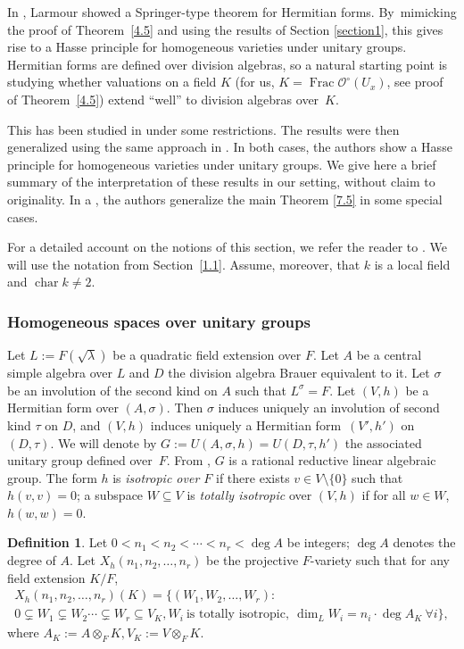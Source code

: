 \documentclass[10pt]{amsart}
\DeclareMathOperator{\Char}{char}
\DeclareMathOperator{\Frac}{Frac}
\let\backslash\setminus
\theoremstyle{definition}
\newtheorem{defn}[thm]{Definition}
\begin{document}
In \cite{larmour}, Larmour showed a Springer-type theorem for Hermitian forms. By~mimicking the proof of Theorem~\ref{4.5} and using the results of Section \ref{section1}, this gives rise to a Hasse principle for homogeneous varieties under unitary groups. Hermitian forms are defined over division algebras, so a natural starting point is studying whether valuations on a field $K$ (for us, $K=\Frac \mathcal{O}^{\circ}(U_x)$, see proof of Theorem~\ref{4.5}) extend ``well'' to division algebras over~$K$.

This has been studied in \cite{wu} under some restrictions. The results were then generalized using the same approach in \cite{parsur}. In both cases, the authors show a Hasse principle for homogeneous varieties under unitary groups. We give here a brief summary of the interpretation of these results in our setting, without claim to originality. In a \cite{guhsur}, the authors generalize the main Theorem \ref{7.5} in some special cases.

For a detailed account on the notions of this section, we refer the reader to \cite{involutions}. We will use the notation from Section~\ref{1.1}. Assume, moreover, that $k$ is a local field and ${\Char k \neq 2}$.

\subsubsection{Homogeneous spaces over unitary groups} \label{subsection7.1}

Let $L:=F(\sqrt{\lambda})$ be a quadratic field extension over $F$. Let $A$ be a central simple algebra over $L$ and $D$ the division algebra Brauer equivalent to it. Let $\sigma$ be an involution of the second kind on $A$ such that $L^{\sigma}=F$. Let $(V,h)$ be a Hermitian form over $(A, \sigma)$. Then $\sigma$ induces uniquely an involution of second kind $\tau$ on $D$, and $(V,h)$ induces uniquely a Hermitian form~$(V', h')$ on~$(D, \tau)$. We will denote by $G:=\textit{U}(A, \sigma, h)=\textit{U}(D, \tau, h')$ the associated unitary group defined over~$F$. From \cite[Prop.\,2.4]{merkchern}, $G$ is a rational reductive linear algebraic group. The form $h$ is \emph{isotropic over $F$} if there exists $v \in V \backslash \{0\}$ such that $h(v,v)=0$; a subspace $W \subseteq V$ is \emph{totally isotropic} over $(V,h)$ if for all $w \in W$, $h(w,w)=0$.

\begin{defn} \label{7.2} Let $0<n_1 < n_2< \cdots < n_r < \deg{A}$ be integers; $\deg{A}$ denotes the degree of $A$. Let $X_h(n_1, n_2, \dots, n_r)$ be the projective $F$-variety such that for any field extension $K/F$,\vspace*{-8pt}
\begin{multline*}
X_h(n_1, n_2, \dots, n_r)(K)=\{(W_1, W_2, \dots, W_r) :\\
0 \subsetneq W_1 \subsetneq W_2 \cdots \subsetneq W_r \subseteq V_K, W_i \ \text{is totally isotropic}, \ \dim_L{W_i}=n_i\cdot \deg{A_K} \ \forall i\},
\end{multline*}
where $A_K:=A \otimes_F K, V_K:=V \otimes_{F} K$.
\end{defn}
\end{document}
